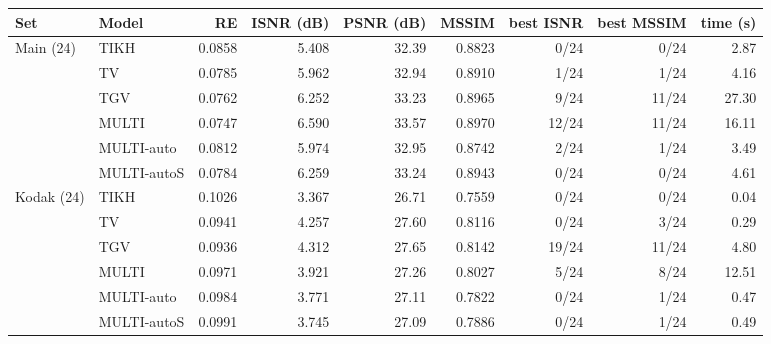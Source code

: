 \begin{tabular}{llrrrrrrr}
\toprule
Set & Model & RE & ISNR (dB) & PSNR (dB) & MSSIM & best ISNR & best MSSIM & time (s) \\
\midrule
Main (24) & TIKH & 0.0858 & 5.408 & 32.39 & 0.8823 & 0/24 & 0/24 & 2.87 \\
 & TV & 0.0785 & 5.962 & 32.94 & 0.8910 & 1/24 & 1/24 & 4.16 \\
 & TGV & 0.0762 & 6.252 & 33.23 & 0.8965 & 9/24 & 11/24 & 27.30 \\
 & MULTI & 0.0747 & 6.590 & 33.57 & 0.8970 & 12/24 & 11/24 & 16.11 \\
 & MULTI-auto & 0.0812 & 5.974 & 32.95 & 0.8742 & 2/24 & 1/24 & 3.49 \\
 & MULTI-autoS & 0.0784 & 6.259 & 33.24 & 0.8943 & 0/24 & 0/24 & 4.61 \\
\midrule
Kodak (24) & TIKH & 0.1026 & 3.367 & 26.71 & 0.7559 & 0/24 & 0/24 & 0.04 \\
 & TV & 0.0941 & 4.257 & 27.60 & 0.8116 & 0/24 & 3/24 & 0.29 \\
 & TGV & 0.0936 & 4.312 & 27.65 & 0.8142 & 19/24 & 11/24 & 4.80 \\
 & MULTI & 0.0971 & 3.921 & 27.26 & 0.8027 & 5/24 & 8/24 & 12.51 \\
 & MULTI-auto & 0.0984 & 3.771 & 27.11 & 0.7822 & 0/24 & 1/24 & 0.47 \\
 & MULTI-autoS & 0.0991 & 3.745 & 27.09 & 0.7886 & 0/24 & 1/24 & 0.49 \\
\bottomrule
\end{tabular}